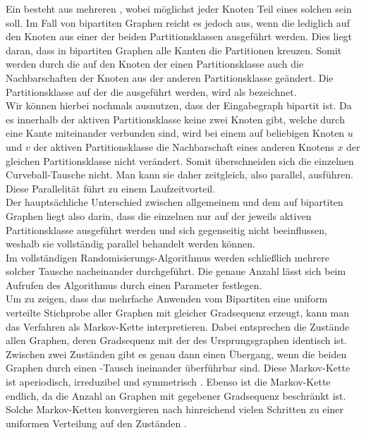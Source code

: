 Ein  besteht aus mehreren , wobei möglichst 
jeder Knoten Teil eines solchen  sein soll. Im Fall von bipartiten Graphen reicht es jedoch
aus, wenn die  lediglich auf den Knoten aus einer der beiden Partitionsklassen ausgeführt werden. Dies
liegt daran, dass in bipartiten Graphen alle Kanten die Partitionen kreuzen. Somit werden durch
die  auf den Knoten der einen Partitionsklasse auch die Nachbarschaften der Knoten aus der anderen
Partitionsklasse geändert. Die Partitionsklasse auf der die  ausgeführt werden, wird als 
 bezeichnet. 
\\

Wir können hierbei nochmals ausnutzen, dass der Eingabegraph bipartit ist. 
Da es innerhalb der aktiven Partitionsklasse
keine zwei Knoten gibt, welche durch eine Kante miteinander verbunden sind, 
wird bei einem \ct{} auf beliebigen Knoten $u$ und $v$ der aktiven Partitionsklasse
die Nachbarschaft eines anderen Knotens $x$ der gleichen Partitionsklasse nicht verändert. Somit
\glqq überschneiden\grqq{} sich die einzelnen Curveball-Tausche nicht. Man kann sie daher zeitgleich, 
also parallel, ausführen. Diese Parallelität führt zu einem Laufzeitvorteil.
\\

Der hauptsächliche Unterschied zwischen allgemeinem \gc{} und dem auf bipartiten Graphen liegt also darin, 
dass die einzelnen  nur auf der jeweils aktiven Partitionsklasse ausgeführt werden und
sich gegenseitig nicht beeinflussen, weshalb sie vollständig parallel behandelt werden können.
\\

Im vollständigen Randomisierungs-Algorithmus werden schließlich mehrere solcher \gc{} Tausche nacheinander
durchgeführt. Die genaue Anzahl lässt sich beim Aufrufen des Algorithmus durch einen Parameter festlegen.
\\

Um zu zeigen, dass das mehrfache Anwenden vom Bipartiten \gc{} eine uniform verteilte
Stichprobe aller Graphen mit gleicher Gradsequenz erzeugt, kann man das Verfahren als Markov-Kette interpretieren.
Dabei entsprechen die Zustände allen Graphen, deren Gradsequenz mit der des Ursprungsgraphen identisch
ist.
Zwischen zwei Zuständen gibt es genau dann einen Übergang, wenn die beiden Graphen durch einen
\gc{}-Tausch ineinander überführbar sind. Diese Markov-Kette 
ist aperiodisch, irreduzibel und symmetrisch \cite{penschuck2020recent}.
 Ebenso ist die Markov-Kette endlich, da die Anzahl an
Graphen mit gegebener Gradsequenz beschränkt ist. 
Solche Markov-Ketten konvergieren nach hinreichend vielen Schritten zu 
einer uniformen Verteilung auf den Zuständen \cite{markov_converge}.






